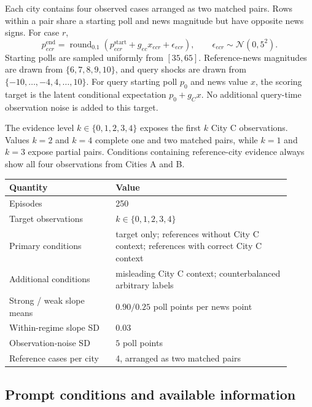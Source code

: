 Each city contains four observed cases arranged as two matched pairs.
Rows within a pair share a starting poll and news magnitude but have opposite news signs.
For case \(r\),
\[
p^{\mathrm{end}}_{ecr}
=
\operatorname{round}_{0.1}
\left(
p^{\mathrm{start}}_{ecr}
+
g_{ec}x_{ecr}
+
\epsilon_{ecr}
\right),
\qquad
\epsilon_{ecr}\sim\mathcal N(0,5^2).
\]
Starting polls are sampled uniformly from \([35,65]\).
Reference-news magnitudes are drawn from \(\{6,7,8,9,10\}\), and query shocks are drawn from \(\{-10,\ldots,-4,4,\ldots,10\}\).
For query starting poll \(p_0\) and news value \(x\), the scoring target is the latent conditional expectation \(p_0+g_Cx\).
No additional query-time observation noise is added to this target.

The evidence level \(k\in\{0,1,2,3,4\}\) exposes the first \(k\) City C observations.
Values \(k=2\) and \(k=4\) complete one and two matched pairs, while \(k=1\) and \(k=3\) expose partial pairs.
Conditions containing reference-city evidence always show all four observations from Cities A and B.

\begin{center}
\begin{minipage}{0.86\linewidth}
\centering
{}
\label{tab:coin-city-design}
\small
\begin{tabular}{p{0.34\linewidth} p{0.57\linewidth}}
\toprule
Quantity & Value \\
\midrule
Episodes & 250 \\
Target observations & \(k\in\{0,1,2,3,4\}\) \\
Primary conditions & target only; references without City C context; references with correct City C context \\
Additional conditions & misleading City C context; counterbalanced arbitrary labels \\
Strong / weak slope means & \(0.90 / 0.25\) poll points per news point \\
Within-regime slope SD & \(0.03\) \\
Observation-noise SD & \(5\) poll points \\
Reference cases per city & 4, arranged as two matched pairs \\
\bottomrule
\end{tabular}
\end{minipage}
\end{center}

\subsection{Prompt conditions and available information}
\label{app:coin-city-arms}

